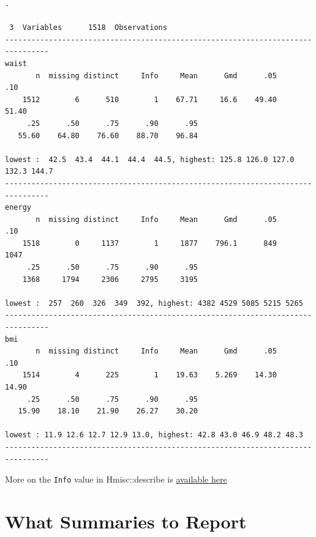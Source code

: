 \documentclass[
]{book}
\newenvironment{Shaded}{\begin{snugshade}}{\end{snugshade}}
\newcommand{\KeywordTok}[1]{\textcolor[rgb]{0.13,0.29,0.53}{\textbf{#1}}}
\newcommand{\NormalTok}[1]{#1}
\newcommand{\OperatorTok}[1]{\textcolor[rgb]{0.81,0.36,0.00}{\textbf{#1}}}
\newcommand{\StringTok}[1]{\textcolor[rgb]{0.31,0.60,0.02}{#1}}
\begin{document}
\begin{Shaded}
\end{Shaded}

\begin{verbatim}
. 

 3  Variables      1518  Observations
--------------------------------------------------------------------------------
waist 
       n  missing distinct     Info     Mean      Gmd      .05      .10 
    1512        6      510        1    67.71     16.6    49.40    51.40 
     .25      .50      .75      .90      .95 
   55.60    64.80    76.60    88.70    96.84 

lowest :  42.5  43.4  44.1  44.4  44.5, highest: 125.8 126.0 127.0 132.3 144.7
--------------------------------------------------------------------------------
energy 
       n  missing distinct     Info     Mean      Gmd      .05      .10 
    1518        0     1137        1     1877    796.1      849     1047 
     .25      .50      .75      .90      .95 
    1368     1794     2306     2795     3195 

lowest :  257  260  326  349  392, highest: 4382 4529 5085 5215 5265
--------------------------------------------------------------------------------
bmi 
       n  missing distinct     Info     Mean      Gmd      .05      .10 
    1514        4      225        1    19.63    5.269    14.30    14.90 
     .25      .50      .75      .90      .95 
   15.90    18.10    21.90    26.27    30.20 

lowest : 11.9 12.6 12.7 12.9 13.0, highest: 42.8 43.0 46.9 48.2 48.3
--------------------------------------------------------------------------------
\end{verbatim}

More on the \texttt{Info} value in Hmisc::describe is \href{https://cran.r-project.org/web/packages/Hmisc/Hmisc.pdf\#page=67}{available here}

\hypertarget{what-summaries-to-report}{%
\section{What Summaries to Report}\label{what-summaries-to-report}}
\end{document}
